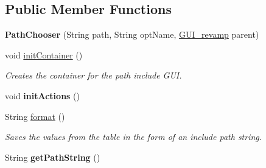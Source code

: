 \subsection*{Public Member Functions}
\begin{DoxyCompactItemize}
\item 
\hypertarget{classedu_1_1udel_1_1cis_1_1vsl_1_1civl_1_1gui_1_1common_1_1PathChooser_ab703889c62a7275ddc376d07f27dfb36}{}{\bfseries Path\+Chooser} (String path, String opt\+Name, \hyperlink{classedu_1_1udel_1_1cis_1_1vsl_1_1civl_1_1gui_1_1common_1_1GUI__revamp}{G\+U\+I\+\_\+revamp} parent)\label{classedu_1_1udel_1_1cis_1_1vsl_1_1civl_1_1gui_1_1common_1_1PathChooser_ab703889c62a7275ddc376d07f27dfb36}

\item 
\hypertarget{classedu_1_1udel_1_1cis_1_1vsl_1_1civl_1_1gui_1_1common_1_1PathChooser_ae5376dd5fe8fd19639be7464d98c9f15}{}void \hyperlink{classedu_1_1udel_1_1cis_1_1vsl_1_1civl_1_1gui_1_1common_1_1PathChooser_ae5376dd5fe8fd19639be7464d98c9f15}{init\+Container} ()\label{classedu_1_1udel_1_1cis_1_1vsl_1_1civl_1_1gui_1_1common_1_1PathChooser_ae5376dd5fe8fd19639be7464d98c9f15}

\begin{DoxyCompactList}\small\item\em Creates the container for the path include G\+U\+I. \end{DoxyCompactList}\item 
\hypertarget{classedu_1_1udel_1_1cis_1_1vsl_1_1civl_1_1gui_1_1common_1_1PathChooser_ac60c3ae3cf6cead5637a049698149943}{}void {\bfseries init\+Actions} ()\label{classedu_1_1udel_1_1cis_1_1vsl_1_1civl_1_1gui_1_1common_1_1PathChooser_ac60c3ae3cf6cead5637a049698149943}

\item 
String \hyperlink{classedu_1_1udel_1_1cis_1_1vsl_1_1civl_1_1gui_1_1common_1_1PathChooser_a2aeb2dc117bc6801f25e25acd53fc23d}{format} ()
\begin{DoxyCompactList}\small\item\em Saves the values from the table in the form of an include path string. \end{DoxyCompactList}\item 
\hypertarget{classedu_1_1udel_1_1cis_1_1vsl_1_1civl_1_1gui_1_1common_1_1PathChooser_a063fcbc6da319b96b18b5dba89e5aeeb}{}String {\bfseries get\+Path\+String} ()\label{classedu_1_1udel_1_1cis_1_1vsl_1_1civl_1_1gui_1_1common_1_1PathChooser_a063fcbc6da319b96b18b5dba89e5aeeb}

\end{DoxyCompactItemize}
